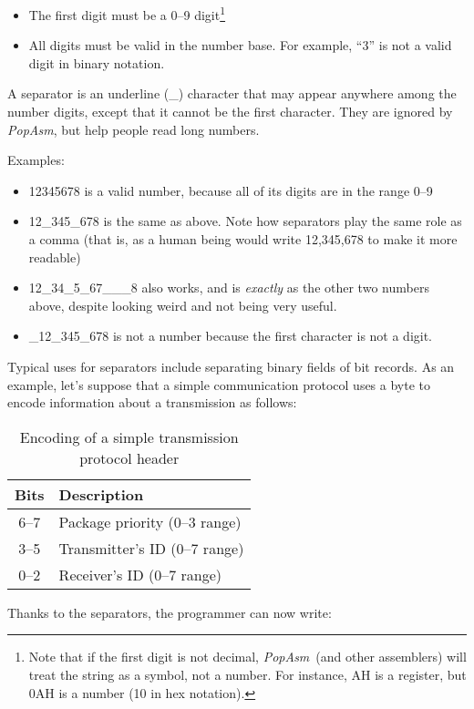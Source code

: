 \documentclass[a4paper,12pt]{book}
\newcommand{\popasm}{\emph{PopAsm}}
\begin{document}
\begin{itemize}
\item{The first digit must be a 0--9 digit\footnote{Note that if the
   first digit is not decimal, \popasm\ (and other assemblers) will treat
   the string as a symbol, not a number. For instance, AH is a register,
   but 0AH is a number (10 in hex notation).}}
\item{All digits must be valid in the number base.} For example, ``3'' is
   not a valid digit in binary notation.
\end{itemize}

A separator is an underline (\_) character that may appear anywhere
among the number digits, except that it cannot be the first character.
They are ignored by \popasm, but help people read long numbers.

Examples:

\begin{itemize}
\item{12345678} is a valid number, because all of its digits are in the
   range 0--9
\item{12\_345\_678} is the same as above. Note how separators play the
   same role as a comma (that is, as a human being would write 12,345,678
   to make it more readable)
\item{12\_34\_5\_67\_\_\_8} also works, and is \emph{exactly} as the
   other two numbers above, despite looking weird and not being very useful.
\item{\_12\_345\_678} is not a number because the first character is not
   a digit.
\end{itemize}

Typical uses for separators include separating binary fields of bit
records. As an example, let's suppose that a simple communication
protocol uses a byte to encode information about a transmission as
follows:

\begin{table}[h]
\begin{center}
\begin{tabular}[h]{cl}
Bits & Description\\
\hline
6--7 & Package priority (0--3 range)\\
3--5 & Transmitter's ID (0--7 range)\\
0--2 & Receiver's ID (0--7 range)\\
\hline
\end{tabular}
\caption{Encoding of a simple transmission protocol header}
\end{center}
\end{table}
Thanks to the separators, the programmer can now write:
\end{document}
